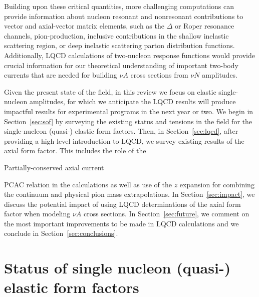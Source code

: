\documentclass{ar-1col}
\begin{document}
Building upon these critical quantities, more challenging computations can provide information about nucleon
resonant and nonresonant contributions to vector and axial-vector matrix elements,
such as the $\Delta$ or Roper resonance channels, pion-production,
inclusive contributions in the shallow inelastic scattering region,
or deep inelastic scattering parton distribution functions.
Additionally, LQCD calculations of two-nucleon response functions would provide crucial information for our theoretical understanding of important two-body currents that are needed for building $\nu A$ cross sections from $\nu N$ amplitudes.

Given the present state of the field, in this review we focus on elastic single-nucleon amplitudes, for which we anticipate the LQCD results will produce impactful results for experimental programs in the next year or two.
We begin in Section~\ref{sec:sof} by surveying the existing status and tensions in the field for the single-nucleon (quasi-) elastic form factors.
Then, in Section~\ref{sec:lqcd}, after providing a high-level introduction to LQCD, we survey existing results of the axial form factor. This includes the role of the%
\begin{marginnote}
  {Partially-conserved} axial current
\end{marginnote}%
PCAC relation in the calculations as well as use of the $z$ expansion for combining the continuum and physical pion mass extrapolations.
In Section~\ref{sec:impact}, we discuss the potential impact of using LQCD determinations of the axial form factor when modeling $\nu A$ cross sections.
In Section~\ref{sec:future}, we comment on the most important improvements to be made in LQCD calculations and we conclude in Section~\ref{sec:conclusions}.


\section{Status of single nucleon (quasi-) elastic form factors\label{sec:sof}}
\end{document}
